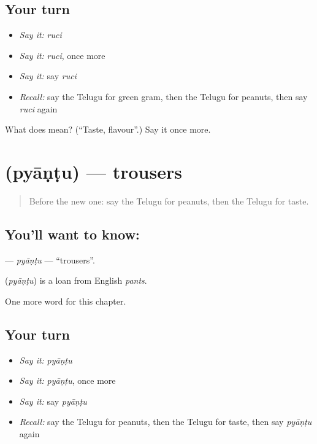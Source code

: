 \subsection*{Your turn}
\begin{itemize}
\raggedright
  \item \emph{Say it:} \emph{ruci}
  \item \emph{Say it:} \emph{ruci}, once more
  \item \emph{Say it:} say \emph{ruci}
  \item \emph{Recall:} say the Telugu for green gram, then the Telugu for peanuts, then say \emph{ruci} again
\end{itemize}

\begin{tcolorbox}[breakable,colback=teal!4,colframe=teal!35!black,title={Before you move on}]
What does  mean? (\textquotedblleft{}Taste, flavour\textquotedblright{}.) Say it once more.
\end{tcolorbox}
\section[\texorpdfstring{\te{ప్యాంటు} (pyāṇṭu)}{ప్యాంటు (pyāṇṭu)}]{ (pyāṇṭu) — trousers}

\label{lesson:TE-C263-pyantu}



\begin{quote}
Before the new one: say the Telugu for peanuts, then the Telugu for taste.
\end{quote}

\subsection*{You'll want to know: }
\textbf{} — \emph{pyāṇṭu} — \textquotedblleft{}trousers\textquotedblright{}.

\begin{cousinweb}
\textbf{} (\emph{pyāṇṭu}) is a loan from English \emph{pants}.
\end{cousinweb}

\begin{grammarlens}[title={What you've built}]
One more word for this chapter.
\end{grammarlens}

\subsection*{Your turn}
\begin{itemize}
\raggedright
  \item \emph{Say it:} \emph{pyāṇṭu}
  \item \emph{Say it:} \emph{pyāṇṭu}, once more
  \item \emph{Say it:} say \emph{pyāṇṭu}
  \item \emph{Recall:} say the Telugu for peanuts, then the Telugu for taste, then say \emph{pyāṇṭu} again
\end{itemize}

